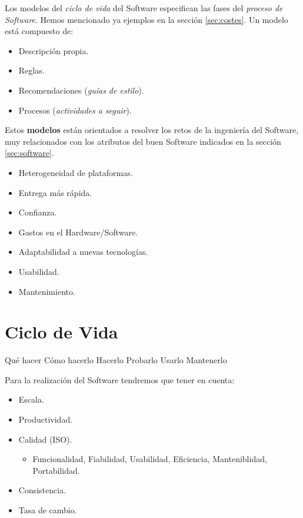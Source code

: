 Los modelos del \emph{ciclo de vida} del Software especifican las
fases del \emph{proceso de Software}. Hemos mencionado ya ejemplos en
la sección \ref{sec:costes}. Un modelo está compuesto de:
\begin{itemize}[noitemsep]
\item Descripción propia.
\item Reglas.
\item Recomendaciones (\emph{guías de estilo}).
\item Procesos (\emph{actividades a seguir}).
\end{itemize}

Estos \textbf{modelos} están orientados a resolver los retos de la ingeniería
del Software, muy relacionados con los atributos
del buen Software indicados en la sección \ref{sec:software}.

\begin{itemize}[noitemsep]
\item Heterogeneidad de plataformas.
\item Entrega más rápida.
\item Confianza.
\item Gastos en el Hardware/Software.
\item Adaptabilidad a nuevas tecnologías.
\item Usabilidad.
\item Mantenimiento.
\end{itemize}

\section{Ciclo de Vida}
\label{sec:cv}

\begin{center}
Qué hacer \textrightarrow Cómo hacerlo \textrightarrow Hacerlo
\textrightarrow Probarlo \textrightarrow Usarlo \textrightarrow
Mantenerlo
\end{center}

Para la realización del Software tendremos que tener en cuenta:
\begin{itemize}[noitemsep]
\item Escala.
\item Productividad.
\item Calidad (ISO).
  \begin{itemize}
  \item Funcionalidad, Fiabilidad, Usabilidad, Eficiencia,
    Manteniblidad, Portabilidad.
  \end{itemize}
\item Consistencia.
\item Tasa de cambio.
\end{itemize}

